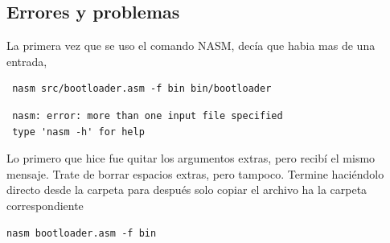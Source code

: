 \documentclass[12pt]{article}
\begin{document}
\subsection{Errores y problemas}
La primera vez que se uso el comando NASM, decía que habia mas de una entrada, 
\begin{verbatim}
 nasm src/bootloader.asm -f bin bin/bootloader
\end{verbatim}
\begin{lstlisting}
 nasm: error: more than one input file specified
 type 'nasm -h' for help
\end{lstlisting}
Lo primero que hice fue quitar los argumentos extras, pero recibí el mismo mensaje. Trate de borrar espacios extras, pero tampoco. Termine haciéndolo directo desde la carpeta para después solo copiar el archivo ha la carpeta correspondiente
\begin{verbatim}
nasm bootloader.asm -f bin 
\end{verbatim}
\nocite{*}


\end{document}
